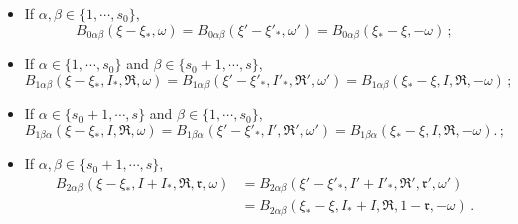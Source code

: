 \documentclass[reqno,11pt]{amsart}
\numberwithin{equation}{section}
\begin{document}
\begin{itemize}
    	\item If $ \alpha, \beta \in \{1, \cdots , s_0\}$,
    	\begin{equation}\label{eq2.03}
    	B_{0 \alpha \beta } (\xi - \xi_* ,  \omega ) = B_{0 \alpha \beta } (\xi' - \xi'_* ,\omega' ) =B_{0 \alpha \beta } (\xi_* - \xi , -\omega )  \,;
    	\end{equation}
        \item If $\alpha \in \{1, \cdots , s_0 \} $ and $\beta \in \{ s_0 + 1, \cdots , s \}$,
        \begin{equation}\label{eq2.04}
        	B_{1 \alpha \beta } (\xi -\xi_* ,  I_*, \mathfrak{R}, \omega ) = B_{1 \alpha \beta } (\xi' - \xi'_* , I'_*, \mathfrak{R}', \omega' ) =B_{1 \alpha \beta } (\xi_* - \xi , I , \mathfrak{R}, -\omega )  \,;
        \end{equation}
        \item If $\alpha \in \{ s_0 + 1, \cdots , s \} $ and $\beta \in \{ 1, \cdots , s_0 \} $,
        \begin{equation}\label{eq2.05}
        	B_{1  \beta  \alpha} (\xi - \xi_* , I ,  \mathfrak{R}, \omega ) = B_{1 \beta  \alpha } (\xi' - \xi'_* , I' , \mathfrak{R}',  \omega' ) =B_{1 \beta \alpha } (\xi_* - \xi ,  I, \mathfrak{R}, -\omega ) . \,;
        \end{equation}
        \item If $ \alpha , \beta \in \{ s_0 + 1, \cdots , s \} $,
        \begin{equation}\label{B-inv}
        \begin{aligned}
            B_{2 \alpha \beta } (\xi - \xi_* , I + I_*, \mathfrak{R}, \mathfrak{r} , \omega ) &= B_{2 \alpha \beta } (\xi' - \xi'_* , I' + I'_*, \mathfrak{R}', \mathfrak{r}' , \omega' )\\
            &=B_{2 \alpha \beta } (\xi_*- \xi , I_* + I, \mathfrak{R}, 1-\mathfrak{r} , -\omega ) \,.
        \end{aligned}
        \end{equation}
    \end{itemize}
\end{document}
